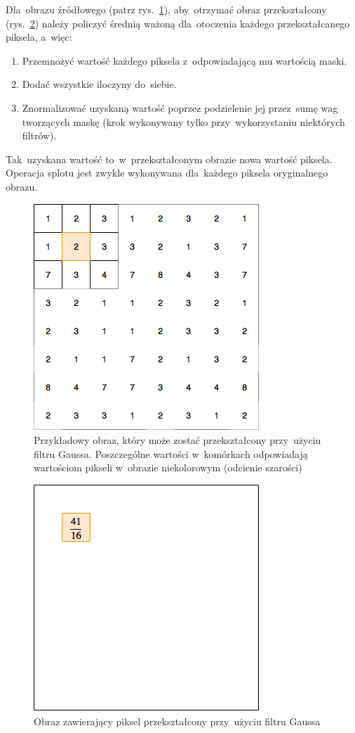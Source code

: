 Dla~obrazu źródłowego (patrz rys.~\ref{rys:img-src-gauss}), aby~otrzymać obraz przekształcony
(rys.~\ref{rys:output-gauss}) należy policzyć średnią ważoną dla~otoczenia każdego przekształcanego piksela, a~więc:
\begin{enumerate}
    \item Przemnożyć wartość każdego piksela z~odpowiadającą mu wartością maski.
    \item Dodać wszystkie iloczyny do~siebie.
    \item Znormalizować uzyskaną wartość poprzez podzielenie jej przez~sumę wag tworzących maskę (krok wykonywany tylko
    przy~wykorzystaniu niektórych filtrów).
\end{enumerate}

Tak~uzyskana wartość to~w~przekształconym obrazie nowa wartość piksela. Operacja splotu jest zwykle wykonywana
dla~każdego piksela oryginalnego obrazu.

\begin{figure}[H]
	\centering
	\includegraphics[width=0.5\linewidth]{img/gauss-conv-src-img.png}
	\caption{Przykładowy obraz, który może zostać przekształcony przy~użyciu filtru Gaussa. Poszczególne wartości
	w~komórkach odpowiadają wartościom pikseli w~obrazie niekolorowym (odcienie szarości)}
	\label{rys:img-src-gauss}
\end{figure}

\begin{figure}[H]
	\centering
	\includegraphics[width=0.5\linewidth]{img/gauss-conv-output.png}
	\caption{Obraz zawierający piksel przekształcony przy~użyciu filtru Gaussa}
	\label{rys:output-gauss}
\end{figure}


